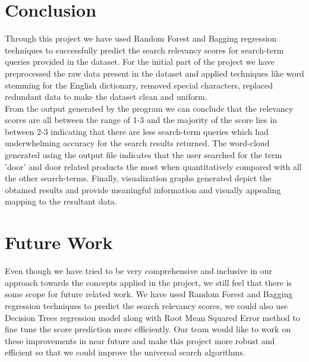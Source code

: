 \documentclass{sig-alternate-05-2015}
\begin{document}
\section{Conclusion}
Through this project we have used Random Forest and Bagging regression techniques to successfully predict the search relevancy scores for search-term queries provided in the dataset. For the initial part of the project we have preprocessed the raw data present in the dataset and applied techniques like word stemming for the English dictionary, removed special characters, replaced redundant data to make the dataset clean and uniform.\\
From the output generated by the program we can conclude that the relevancy scores are all between the range of 1-3 and the majority of the score lies in between 2-3 indicating that there are less search-term queries which had underwhelming accuracy for the search results returned. The word-cloud generated using the output file indicates that the user searched for the term 'door' and door related products the most when quantitatively compared with all the other search-terms. Finally, visualization graphs generated depict the obtained results and provide meaningful information and visually appealing mapping to the resultant data. 
\newline

\section{Future Work}
Even though we have tried to be very comprehensive and inclusive in our approach towards the concepts applied in the project, we still feel that there is some scope for future related work. We have used Random Forest and Bagging regression techniques to predict the search relevancy scores, we could also use Decision Trees regression model along with Root Mean Squared Error method to fine tune the score prediction more efficiently. Our team would like to work on these improvements in near future and make this project more robust and efficient so that we could improve the universal search algorithms.  
\newline


 
\end{document}

